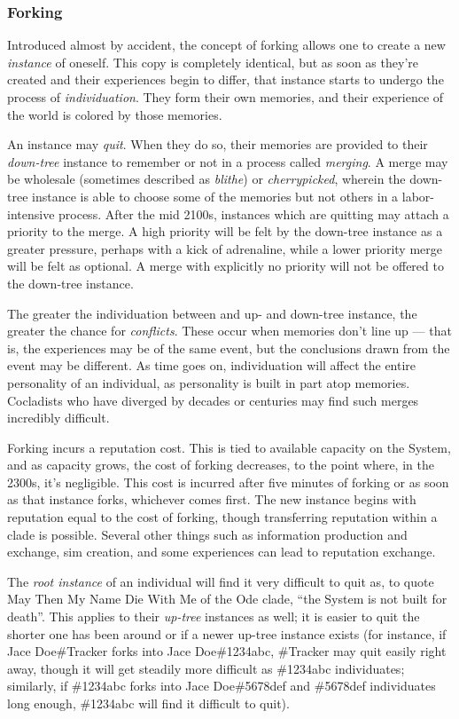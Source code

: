 \subsubsection{Forking}

Introduced almost by accident, the concept of forking allows one to create a new \emph{instance} of oneself. This copy is completely identical, but as soon as they're created and their experiences begin to differ, that instance starts to undergo the process of \emph{individuation}. They form their own memories, and their experience of the world is colored by those memories.

An instance may \emph{quit}. When they do so, their memories are provided to their \emph{down-tree} instance to remember or not in a process called \emph{merging}. A merge may be wholesale (sometimes described as \emph{blithe}) or \emph{cherrypicked}, wherein the down-tree instance is able to choose some of the memories but not others in a labor-intensive process. After the mid 2100s, instances which are quitting may attach a priority to the merge. A high priority will be felt by the down-tree instance as a greater pressure, perhaps with a kick of adrenaline, while a lower priority merge will be felt as optional. A merge with explicitly no priority will not be offered to the down-tree instance.

The greater the individuation between and up- and down-tree instance, the greater the chance for \emph{conflicts}. These occur when memories don't line up --- that is, the experiences may be of the same event, but the conclusions drawn from the event may be different. As time goes on, individuation will affect the entire personality of an individual, as personality is built in part atop memories. Cocladists who have diverged by decades or centuries may find such merges incredibly difficult.

Forking incurs a reputation cost. This is tied to available capacity on the System, and as capacity grows, the cost of forking decreases, to the point where, in the 2300s, it's negligible. This cost is incurred after five minutes of forking or as soon as that instance forks, whichever comes first. The new instance begins with reputation equal to the cost of forking, though transferring reputation within a clade is possible. Several other things such as information production and exchange, sim creation, and some experiences can lead to reputation exchange.

The \emph{root instance} of an individual will find it very difficult to quit as, to quote May Then My Name Die With Me of the Ode clade, ``the System is not built for death''. This applies to their \emph{up-tree} instances as well; it is easier to quit the shorter one has been around or if a newer up-tree instance exists (for instance, if Jace Doe\#Tracker forks into Jace Doe\#1234abc, \#Tracker may quit easily right away, though it will get steadily more difficult as \#1234abc individuates; similarly, if \#1234abc forks into Jace Doe\#5678def and \#5678def individuates long enough, \#1234abc will find it difficult to quit).


